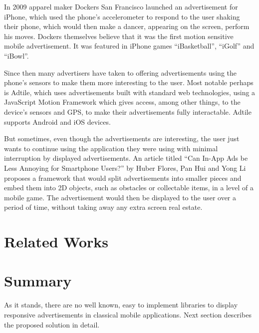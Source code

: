In 2009 apparel maker Dockers San Francisco launched an advertisement for iPhone, which used the phone’s accelerometer to respond to the user shaking their phone, which would then make a dancer, appearing on the screen, perform his moves. Dockers themselves believe that it was the first motion sensitive mobile advertisement. It was featured in iPhone games “iBasketball”, “iGolf” and “iBowl”.\cite{dockers}

Since then many advertisers have taken to offering advertisements using the phone’s sensors to make them more interesting to the user. Most notable perhaps is Adtile, which uses advertisements built with standard web technologies, using a JavaScript Motion Framework which gives access, among other things, to the device’s sensors and GPS, to make their advertisements fully interactable. Adtile supports Android and iOS devices. \cite{adtile}

But sometimes, even though the advertisements are interesting, the user just wants to continue using the application they were using with minimal interruption by displayed advertisements. An article titled “Can In-App Ads be Less Annoying for Smartphone Users?” by Huber Flores, Pan Hui and Yong Li proposes a framework that would split advertisements into smaller pieces and embed them into 2D objects, such as obstacles or collectable items, in a level of a mobile game. The advertisement would then be displayed to the user over a period of time, without taking away any extra screen real estate. \cite{gesture-ads}

\section{Related Works}

\section{Summary}

As it stands, there are no well known, easy to implement libraries to display responsive advertisements in classical mobile applications. Next section describes the proposed solution in detail.

